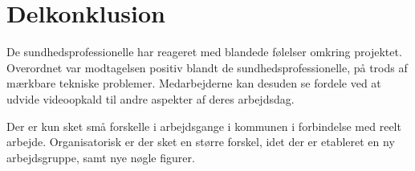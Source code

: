 \section{Delkonklusion}
De sundhedsprofessionelle har reageret med blandede følelser omkring projektet. Overordnet var modtagelsen positiv blandt de sundhedsprofessionelle, på trods af mærkbare tekniske problemer. Medarbejderne kan desuden se fordele ved at udvide videoopkald til andre aspekter af deres arbejdsdag. 

Der er kun sket små forskelle i arbejdsgange i kommunen i forbindelse med reelt arbejde. Organisatorisk er der sket en større forskel, idet der er etableret en ny arbejdsgruppe, samt nye nøgle figurer. \\
